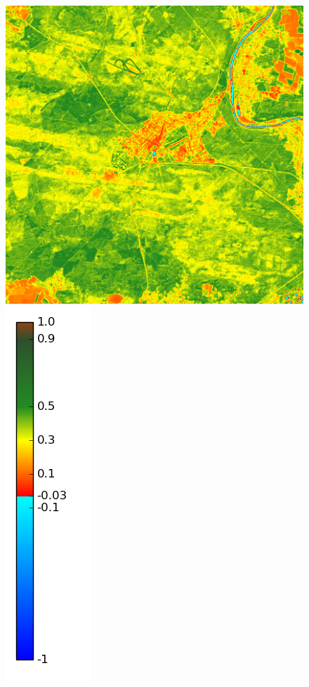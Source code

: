 \documentclass{book}
\begin{document}
\begin{figure}[H]
{\includegraphics[scale=0.2]{images/Fontainebleau/09_ndvi.png}
\includegraphics[scale=0.2]{images/colormap.png}
}
\end{figure}
\end{document}
